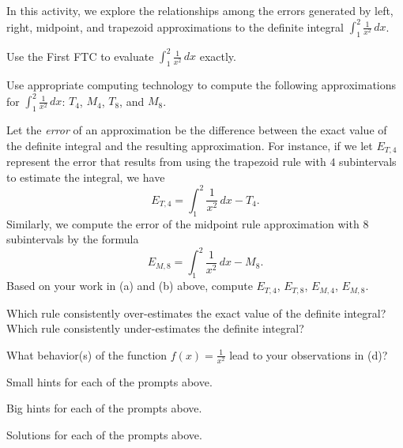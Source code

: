\begin{activity} \label{A:5.6.1}  In this activity, we explore the relationships among the errors generated by left, right, midpoint, and trapezoid approximations to the definite integral $\int_1^2 \frac{1}{x^2} \, dx$. 
\ba
	\item Use the First FTC to evaluate $\int_1^2 \frac{1}{x^2} \, dx$ exactly.
	\item Use appropriate computing technology to compute the following approximations for $\int_1^2 \frac{1}{x^2} \, dx$:  $T_4$, $M_4$, $T_8$, and $M_8$.  
	\item Let the \emph{error}    of an approximation be the difference between the exact value of the definite integral and the resulting approximation.  For instance, if we let $E_{T,4}$ represent the error that results from using the trapezoid rule with $4$ subintervals to estimate the integral, we have 
	$$E_{T,4} = \int_1^2 \frac{1}{x^2} \, dx -  T_4.$$
	Similarly, we compute the error of the midpoint rule approximation with 8 subintervals by the formula
	$$E_{M,8} = \int_1^2 \frac{1}{x^2} \, dx -  M_8.$$
	Based on your work in (a) and (b) above, compute $E_{T,4}$, $E_{T,8}$, $E_{M,4}$, $E_{M,8}$.
	\item Which rule consistently over-estimates the exact value of the definite integral?  Which rule consistently under-estimates the definite integral?
	\item What behavior(s) of the function $f(x) = \frac{1}{x^2}$ lead to your observations in (d)?
\ea
\end{activity}
\begin{smallhint}
\ba
	\item Small hints for each of the prompts above.
\ea
\end{smallhint}
\begin{bighint}
\ba
	\item Big hints for each of the prompts above.
\ea
\end{bighint}
\begin{activitySolution}
\ba
	\item Solutions for each of the prompts above.
\ea
\end{activitySolution}
\aftera